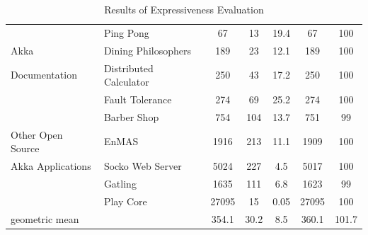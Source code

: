 \begin{table}[!ht]
\begin{center}
\begin{tabular}{| p{3.2 cm} | p{3.5 cm} | c | c |  c | c | c |}
                                                               & Ping Pong & 67
& 13 & 19.4 & 67 & 100 \\
\cline{2-7}
Akka                 & Dining Philosophers & 189 & 23 & 12.1 &
189 & 100  \\
\cline{2-7}
Documentation             & Distributed Calculator  & 250 &
43 & 17.2 & 250 & 100 \\
\cline{2-7}
\citep{akka_doc}                                                     & Fault Tolerance & 274 &
69 & 25.2 & 274 & 100 \\
\hline

                                                    & Barber Shop 
\citep{BarberShop}& 754 & 104 & 
13.7 & 751 & 99 \\
\cline{2-7}
Other Open Source             & EnMAS \citep{EnMAS} & 1916 & 213 & 11.1 & 1909 &
100 \\
\cline{2-7}
  Akka Applications                & Socko Web Server \citep{SOCKO}  & 5024 & 
227
& 4.5 & 5017 & 100 \\
\cline{2-7}
                                                     & Gatling \citep{Gatling}
& 1635 & 111 & 6.8 & 1623 & 99 \\
\cline{2-7}
                                                     & Play Core 
\citep{play_doc}
& 27095 & 15 & 0.05 & 27095 & 100 \\
\hline
geometric mean                   & & 354.1 & 30.2 & 8.5 & 360.1 & 101.7 \\
\hline
\end{tabular}
\caption{Results of Expressiveness Evaluation}
\end{center}
\label{express}
\vspace{-10pt}
\end{table}

